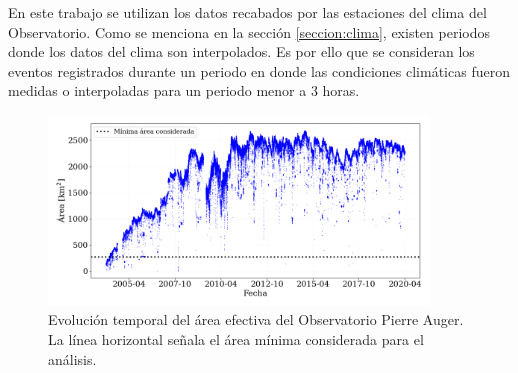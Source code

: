 En este trabajo se utilizan los datos recabados por las estaciones del clima del Observatorio. Como se menciona en la sección \ref{seccion:clima}, existen periodos donde los datos del clima son interpolados. Es por ello que se consideran los eventos registrados durante un periodo en donde las condiciones climáticas fueron medidas o interpoladas para un periodo menor a 3 horas.


\begin{figure}[H]
    \centering
    \includegraphics[width=0.9\textwidth]{Graphs/clima/area_v2.png}
    \caption{Evolución temporal del área efectiva del Observatorio Pierre Auger. La línea horizontal señala el área mínima considerada para el análisis.}
    \label{fig:area}
\end{figure}

